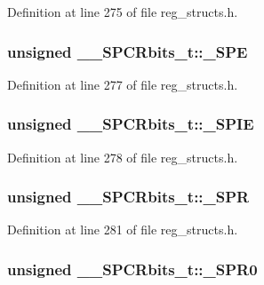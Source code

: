 Definition at line 275 of file reg\+\_\+structs.\+h.

\hypertarget{union_____s_p_c_rbits__t_a4c11fd26c5a7d1f83c77acee3ca48c7e}{
\subsubsection[{\+\_\+\+S\+P\+E}]{\setlength{\rightskip}{0pt plus 5cm}unsigned \+\_\+\+\_\+\+S\+P\+C\+Rbits\+\_\+t\+::\+\_\+\+S\+P\+E}}\label{union_____s_p_c_rbits__t_a4c11fd26c5a7d1f83c77acee3ca48c7e}


Definition at line 277 of file reg\+\_\+structs.\+h.

\hypertarget{union_____s_p_c_rbits__t_a5d00a7ae12a6e8fc3bbef1a0776ff919}{
\subsubsection[{\+\_\+\+S\+P\+I\+E}]{\setlength{\rightskip}{0pt plus 5cm}unsigned \+\_\+\+\_\+\+S\+P\+C\+Rbits\+\_\+t\+::\+\_\+\+S\+P\+I\+E}}\label{union_____s_p_c_rbits__t_a5d00a7ae12a6e8fc3bbef1a0776ff919}


Definition at line 278 of file reg\+\_\+structs.\+h.

\hypertarget{union_____s_p_c_rbits__t_ac33e231100cc426e979611202456f2ef}{
\subsubsection[{\+\_\+\+S\+P\+R}]{\setlength{\rightskip}{0pt plus 5cm}unsigned \+\_\+\+\_\+\+S\+P\+C\+Rbits\+\_\+t\+::\+\_\+\+S\+P\+R}}\label{union_____s_p_c_rbits__t_ac33e231100cc426e979611202456f2ef}


Definition at line 281 of file reg\+\_\+structs.\+h.

\hypertarget{union_____s_p_c_rbits__t_a4bbf8c9e5c1acd96c09c2b6223245e8c}{
\subsubsection[{\+\_\+\+S\+P\+R0}]{\setlength{\rightskip}{0pt plus 5cm}unsigned \+\_\+\+\_\+\+S\+P\+C\+Rbits\+\_\+t\+::\+\_\+\+S\+P\+R0}}\label{union_____s_p_c_rbits__t_a4bbf8c9e5c1acd96c09c2b6223245e8c}


